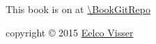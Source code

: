 \maketitle
	
\vspace*{\fill}

This book is on  at \url{\BookGitRepo}

\vspace*{\fill}

copyright \copyright{} 2015 \href{http://eelcovisser.org}{Eelco Visser}
	
\newpage
\tableofcontents

